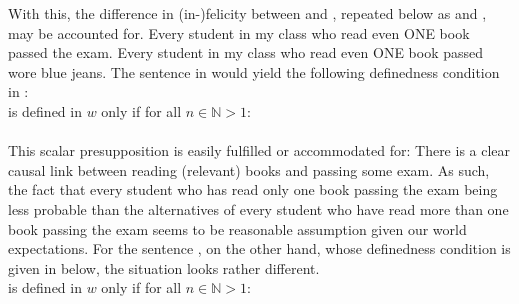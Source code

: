 With this, the difference in (in-)felicity between  and , repeated below as  and , may be accounted for.
\pex[nopreamble=true]%
\a{} Every student in my class who read even \MakeUppercase{one} book passed the exam.
\a{}\ljudge{\#}Every student in my class who read even \MakeUppercase{one} book passed wore blue jeans.
\xe
The sentence in  would yield the following definedness condition in :
\ex{}
{}\\is defined in $w$ only if for all $n\in\mathbb{N}>1$:\\\\
\xe
This scalar presupposition is easily fulfilled or accommodated for: There is a clear causal link between reading (relevant) books and passing some exam. As such, the fact that every student who has read only one book passing the exam being less probable than the alternatives of every student who have read more than one book passing the exam seems to be reasonable assumption given our world expectations. For the sentence , on the other hand, whose definedness condition is given in  below, the situation looks rather different.
\ex{}
{}\\is defined in $w$ only if for all $n\in\mathbb{N}>1$:\\\\
